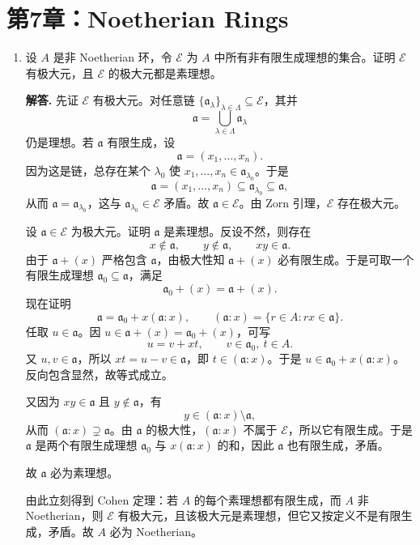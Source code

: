 \documentclass[a4paper]{ctexart}
\begin{document}
\section{第7章：Noetherian Rings}

\begin{enumerate}[leftmargin=*, label=\textbf{7.\arabic*.}]
\item 设 \(A\) 是非 Noetherian 环，令 \(\mathcal E\) 为 \(A\) 中所有非有限生成理想的集合。证明 \(\mathcal E\) 有极大元，且 \(\mathcal E\) 的极大元都是素理想。

\textbf{解答.}
先证 \(\mathcal E\) 有极大元。对任意链 \(\{\mathfrak a_\lambda\}_{\lambda\in\Lambda}\subseteq \mathcal E\)，其并
\[
\mathfrak a=\bigcup_{\lambda\in\Lambda}\mathfrak a_\lambda
\]
仍是理想。若 \(\mathfrak a\) 有限生成，设
\[
\mathfrak a=(x_1,\dots,x_n).
\]
因为这是链，总存在某个 \(\lambda_0\) 使 \(x_1,\dots,x_n\in \mathfrak a_{\lambda_0}\)。于是
\[
\mathfrak a=(x_1,\dots,x_n)\subseteq \mathfrak a_{\lambda_0}\subseteq \mathfrak a,
\]
从而 \(\mathfrak a=\mathfrak a_{\lambda_0}\)，这与 \(\mathfrak a_{\lambda_0}\in \mathcal E\) 矛盾。故 \(\mathfrak a\in \mathcal E\)。由 Zorn 引理，\(\mathcal E\) 存在极大元。

设 \(\mathfrak a\in \mathcal E\) 为极大元。证明 \(\mathfrak a\) 是素理想。反设不然，则存在
\[
x\notin \mathfrak a,\qquad y\notin \mathfrak a,\qquad xy\in \mathfrak a.
\]
由于 \(\mathfrak a+(x)\) 严格包含 \(\mathfrak a\)，由极大性知 \(\mathfrak a+(x)\) 必有限生成。于是可取一个有限生成理想 \(\mathfrak a_0\subseteq \mathfrak a\)，满足
\[
\mathfrak a_0+(x)=\mathfrak a+(x).
\]
现在证明
\[
\mathfrak a=\mathfrak a_0+x(\mathfrak a:x),
\qquad
(\mathfrak a:x)=\{r\in A:rx\in \mathfrak a\}.
\]
任取 \(u\in \mathfrak a\)。因 \(u\in \mathfrak a+(x)=\mathfrak a_0+(x)\)，可写
\[
u=v+xt,\qquad v\in \mathfrak a_0,\ t\in A.
\]
又 \(u,v\in \mathfrak a\)，所以 \(xt=u-v\in \mathfrak a\)，即 \(t\in(\mathfrak a:x)\)。于是 \(u\in \mathfrak a_0+x(\mathfrak a:x)\)。反向包含显然，故等式成立。

又因为 \(xy\in\mathfrak a\) 且 \(y\notin\mathfrak a\)，有
\[
y\in(\mathfrak a:x)\setminus \mathfrak a,
\]
从而 \((\mathfrak a:x)\supsetneq \mathfrak a\)。由 \(\mathfrak a\) 的极大性，\((\mathfrak a:x)\) 不属于 \(\mathcal E\)，所以它有限生成。于是 \(\mathfrak a\) 是两个有限生成理想 \(\mathfrak a_0\) 与 \(x(\mathfrak a:x)\) 的和，因此 \(\mathfrak a\) 也有限生成，矛盾。

故 \(\mathfrak a\) 必为素理想。

由此立刻得到 Cohen 定理：若 \(A\) 的每个素理想都有限生成，而 \(A\) 非 Noetherian，则 \(\mathcal E\) 有极大元，且该极大元是素理想，但它又按定义不是有限生成，矛盾。故 \(A\) 必为 Noetherian。


\end{enumerate}
\end{document}
